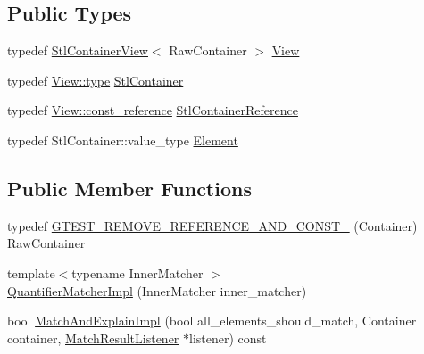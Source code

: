\subsection*{Public Types}
\begin{DoxyCompactItemize}
\item 
typedef \hyperlink{classtesting_1_1internal_1_1_stl_container_view}{Stl\+Container\+View}$<$ Raw\+Container $>$ \hyperlink{classtesting_1_1internal_1_1_quantifier_matcher_impl_aa1e6b1653b6fdee1b0cfc4c58a9059e6}{View}
\item 
typedef \hyperlink{classtesting_1_1internal_1_1_stl_container_view_a2b2c63a6dcdbfe63fb0ee121ebf463ba}{View\+::type} \hyperlink{classtesting_1_1internal_1_1_quantifier_matcher_impl_a7faa9a49c627e6db66e0ff9cdc88b6fc}{Stl\+Container}
\item 
typedef \hyperlink{classtesting_1_1internal_1_1_stl_container_view_a9cd4f6ed689b3938cdb7b3c4cbf1b36b}{View\+::const\+\_\+reference} \hyperlink{classtesting_1_1internal_1_1_quantifier_matcher_impl_a341dd7815b3c6090d935026daac6e938}{Stl\+Container\+Reference}
\item 
typedef Stl\+Container\+::value\+\_\+type \hyperlink{classtesting_1_1internal_1_1_quantifier_matcher_impl_a6f73e2e5fa853f8b5fdd33d6a1811f9e}{Element}
\end{DoxyCompactItemize}
\subsection*{Public Member Functions}
\begin{DoxyCompactItemize}
\item 
typedef \hyperlink{classtesting_1_1internal_1_1_quantifier_matcher_impl_aa3648a9fce92090dc3987eb10faf16e1}{G\+T\+E\+S\+T\+\_\+\+R\+E\+M\+O\+V\+E\+\_\+\+R\+E\+F\+E\+R\+E\+N\+C\+E\+\_\+\+A\+N\+D\+\_\+\+C\+O\+N\+S\+T\+\_\+} (Container) Raw\+Container
\item 
{\footnotesize template$<$typename Inner\+Matcher $>$ }\\\hyperlink{classtesting_1_1internal_1_1_quantifier_matcher_impl_aef125c9971ea1d02d138cd8fd2af0287}{Quantifier\+Matcher\+Impl} (Inner\+Matcher inner\+\_\+matcher)
\item 
bool \hyperlink{classtesting_1_1internal_1_1_quantifier_matcher_impl_ab8f64532b70f47fc60f7983ebe5cbfc6}{Match\+And\+Explain\+Impl} (bool all\+\_\+elements\+\_\+should\+\_\+match, Container container, \hyperlink{classtesting_1_1_match_result_listener}{Match\+Result\+Listener} $\ast$listener) const
\end{DoxyCompactItemize}
